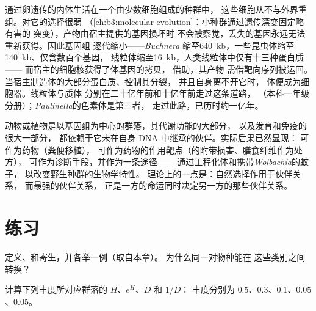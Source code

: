 \begin{proposition}[基因组缩减与通往细胞器之路]\label{prop:b3:microbiomes:reduction}
通过卵遗传的内体生活在一个由少数细胞组成的种群中，
这些细胞从不与外界重组。对它的选择很弱
（\cref{ch:b3:molecular-evolution}：小种群通过遗传漂变固定略有害的
突变），产物由宿主提供的基因损坏时
不会被察觉，丢失的基因永远无法重新获得。因此基因组
逐代缩小——\emph{Buchnera}
缩至\qty{640}{kb}，一些昆虫体缩至\qty{140}{kb}、仅含数百个基因，
线粒体缩至\qty{16}{kb}，人类线粒体中仅有十三种蛋白质——
而宿主的细胞核获得了体基因的拷贝，
借助\emph{}，其产物
需借靶向序列被运回。当宿主制造体的大部分蛋白质、控制其分裂，
并且自身离不开它时，
体便成为细胞器。线粒体与质体
分别在二十亿年前和十亿年前走过这条道路，
（本科一年级分册）；\emph{Paulinella}的色素体是第三者，
走过此路，已历时约一亿年。
\end{proposition}

\begin{remark}[再论个体]\label{rem:b3:microbiomes:individual}
动物或植物是以基因组为中心的群落，其代谢功能的大部分，
以及发育和免疫的很大一部分，
都依赖于它未在自身 DNA 中继承的伙伴。实际后果已然显现：
可作为药物（粪便移植），
可作为药物的作用靶点（的附带损害、膳食纤维作为处方），
可作为诊断手段，并作为一条途径——
通过工程化体和携带\emph{Wolbachia}的蚊子，
以改变野生种群的生物学特性。
理论上的一点是：自然选择作用于伙伴关系，
而最强的伙伴关系，
正是一方的命运同时决定另一方的那些伙伴关系。
\end{remark}

\section{练习}

\begin{exercise}[$\star$]\label{exo:b3:microbiomes:1}
定义、和寄生，并各举一例（取自本章）。
为什么同一对物种能在
这些类别之间转换？
\end{exercise}

\begin{exercise}[$\star$]\label{exo:b3:microbiomes:2}
计算下列丰度所对应群落的 $H$、$e^{H}$、$D$ 和 $1/D$：
丰度分别为 $0.5$、$0.3$、$0.1$、$0.05$、$0.05$。
\end{exercise}

